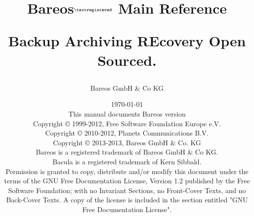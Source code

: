 {
\parskip 10pt

\title{%
  \Huge{Bareos}$^{\normalsize \textregistered}$ \Huge{Main Reference}
  \begin{center}
   \large{Backup Archiving REcovery Open Sourced. }
  \end{center}
}


\author{Bareos GmbH \& Co KG}
\date{\vspace{1.0in}\today \\
      This manual documents Bareos version  \\
      \vspace{0.2in}
      Copyright {\copyright} 1999-2012, Free Software Foundation Europe e.V. \\
      Copyright {\copyright} 2010-2012, Planets Communications B.V. \\
      Copyright {\copyright} 2013-2013, Bareos GmbH \& Co. KG \\
      Bareos {\textregistered} is a registered trademark of Bareos GmbH \& Co KG.\\
      Bacula {\textregistered} is a registered trademark of Kern Sibbald.\\
      \vspace{0.2in}
  Permission is granted to copy, distribute and/or modify this document under the terms of the
  GNU Free Documentation License, Version 1.2 published by the Free Software Foundation;
  with no Invariant Sections, no Front-Cover Texts, and no Back-Cover Texts.
  A copy of the license is included in the section entitled "GNU Free Documentation License".
}

\maketitle
}